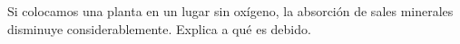 Si colocamos una planta en un lugar sin oxígeno, la
absorción de sales minerales disminuye considerablemente. Explica a qué es debido.

\begin{solutionbox}{3cm}

\end{solutionbox}
